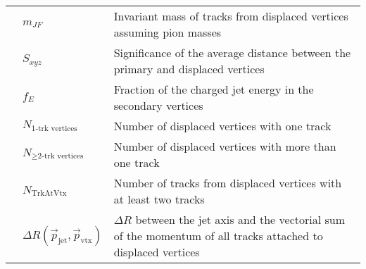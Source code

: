 \begin{table}[!htb]
\begin{scriptsize}
\begin{center}
\begin{tabularx}{\textwidth}{|X|l|X|}
    \cline{2-3}
            & $m_{JF}$ & Invariant mass of tracks from displaced vertices assuming pion masses \\
    \cline{2-3}
            & $S_{xyz}$ & Significance of the average distance between the primary and displaced vertices \\
    \cline{2-3}
            & $f_E$ & Fraction of the charged jet energy in the secondary vertices \\
    \cline{2-3}
            & $N_{\text{1-trk vertices}}$ & Number of displaced vertices with one track \\
    \cline{2-3}
            & $N_{\ge\text{2-trk vertices}}$ & Number of displaced vertices with more than one track \\
    \cline{2-3}
            & $N_{\text{TrkAtVtx}}$ & Number of tracks from displaced vertices with at least two tracks \\
    \cline{2-3}
            & $\Delta R(\vec{p}_{\text{jet}}, \vec{p}_{\text{vtx}})$ & $\Delta R$ between the jet axis and the vectorial sum of the momentum of all tracks attached to displaced vertices \\
    \hline
    \hline
    \end{tabularx}
    \end{center}
    \end{scriptsize}
\end{table}
